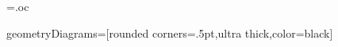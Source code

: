 \ifhandout
{}
\else
\newtheorem{freeResponse}{Response:}
\fi

\newwrite\outcomefile
  \immediate\openout\outcomefile=\jobname.oc
\renewcommand{\outcome}[1]{\edef\theoutcomes{\theoutcomes #1~}%
\immediate\write\outcomefile{\unexpanded{\outcome}{#1}}}



\newcommand{\snap}{{\bfseries\itshape\textsf{Snap!}}}
\newcommand{\flavor}{\link[\snap]{https://snap.berkeley.edu/}}


\usepackage{tkz-euclide}
\tikzstyle geometryDiagrams=[rounded corners=.5pt,ultra thick,color=black]
